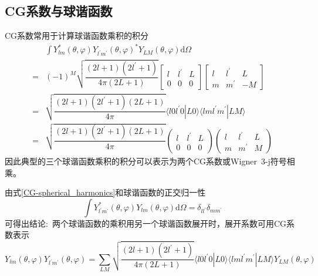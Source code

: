 \subsection{\rm{CG}系数与球谐函数}
\textrm{CG}系数常用于计算球谐函数乘积的积分
\begin{equation}
	\begin{aligned}
		&\int Y_{lm}^{\ast}(\theta,\varphi)Y_{l^{\prime}m^{\prime}}(\theta,\varphi)^{\ast}Y_{LM}(\theta,\varphi)\mathrm{d}\Omega\\
		=&(-1)^M\sqrt{\dfrac{(2l+1)(2l^{\prime}+1)}{4\pi(2L+1)}}\begin{bmatrix}l &l^{\prime} &L\\0 &0 &0\end{bmatrix}\begin{bmatrix}l &l^{\prime} &L\\m &m^{\prime} &-M\end{bmatrix}\\
			=&\sqrt{\dfrac{(2l+1)(2l^{\prime}+1)(2L+1)}{4\pi}}\langle l0l^{\prime}0|L0\rangle\langle lml^{\prime}m^{\prime}|LM\rangle\\
			=&\sqrt{\dfrac{(2l+1)(2l^{\prime}+1)(2L+1)}{4\pi}}\begin{pmatrix}l &l^{\prime} &L\\ 0 &0 &0\end{pmatrix}\begin{pmatrix}l &l^{\prime} &L\\m &m^{\prime} &M\end{pmatrix}
	\end{aligned}
	\label{CG-spherical_harmonics}
\end{equation}
因此典型的三个球谐函数乘积的积分可以表示为两个\textrm{CG}系数或\textrm{Wigner~3-j}符号相乘。

由式\eqref{CG-spherical_harmonics}和球谐函数的正交归一性
\begin{equation}
	\int Y_{l^{\prime}m^{\prime}}^{\ast}(\theta,\varphi)Y_{lm}(\theta,\varphi)\mathrm{d}\Omega=\delta_{ll^{\prime}}\delta_{mm^{\prime}}
	\label{SH-orthonormality}
\end{equation}
可得出结论:~两个球谐函数的乘积用另一个球谐函数展开时，展开系数可用\textrm{CG}系数表示
\begin{equation}
	Y_{lm}(\theta,\varphi)Y_{l^{\prime}m^{\prime}}(\theta,\varphi)=\sum_{LM}\sqrt{\dfrac{(2l+1)(2l^{\prime}+1)}{4\pi(2L+1)}}\langle l0l^{\prime}0|L0\rangle\langle lml^{\prime}m^{\prime}|LM\rangle Y_{LM}(\theta,\varphi)
	\label{eq:CG-spherical_harmonics_expand}
\end{equation}

